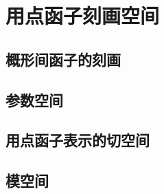\section{用点函子刻画空间}\label{s:6.2}
\subsection{概形间函子的刻画}\label{s:6.2.1}
\subsection{参数空间}\label{s:6.2.2}
\subsection{用点函子表示的切空间}\label{s:6.2.3}
\subsection{模空间}\label{s:6.2.4}
